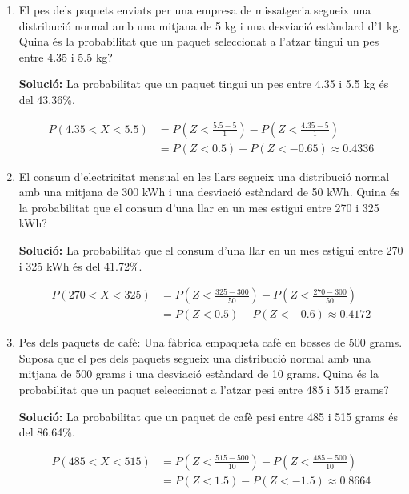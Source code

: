 \documentclass[12pt]{article}
\begin{document}
\begin{exemple} [title=]

\begin{enumerate} [start=19]

    \item El pes dels paquets enviats per una empresa de missatgeria segueix una distribució normal amb una mitjana de 5 kg i una desviació estàndard d'1 kg. Quina és la probabilitat que un paquet seleccionat a l'atzar tingui un pes entre 4.35 i 5.5 kg?
    
    \textbf{Solució:} La probabilitat que un paquet tingui un pes entre 4.35 i 5.5 kg és del 43.36\%.
    
    \begin{align*}
    P(4.35 < X < 5.5) &= P\left(Z< \frac{5.5 - 5}{1} \right) - P\left(Z< \frac{4.35 - 5}{1} \right) \\
    &= P(Z< 0.5) - P(Z< -0.65) \approx 0.4336  
    \end{align*}

    

    \item El consum d'electricitat mensual en les llars segueix una distribució normal amb una mitjana de 300 kWh i una desviació estàndard de 50 kWh. Quina és la probabilitat que el consum d'una llar en un mes estigui entre 270 i 325 kWh?
    
    \textbf{Solució:} La probabilitat que el consum d'una llar en un mes estigui entre 270 i 325 kWh és del 41.72\%.
    
    \begin{align*}
    P(270 < X < 325) &= P\left(Z< \frac{325 - 300}{50} \right) - P\left(Z< \frac{270 - 300}{50} \right) \\
    &= P(Z< 0.5) - P(Z< -0.6) \approx 0.4172
    \end{align*}


    \item Pes dels paquets de cafè: Una fàbrica empaqueta cafè en bosses de 500 grams. Suposa que el pes dels paquets segueix una distribució normal amb una mitjana de 500 grams i una desviació estàndard de 10 grams. Quina és la probabilitat que un paquet seleccionat a l'atzar pesi entre 485 i 515 grams?
    
    \textbf{Solució:} La probabilitat que un paquet de cafè pesi entre 485 i 515 grams és del 86.64\%.
    
    \begin{align*}
    P(485 < X < 515) &= P\left(Z< \frac{515 - 500}{10} \right) - P\left(Z< \frac{485 - 500}{10} \right) \\
    &= P(Z< 1.5) - P(Z< -1.5) \approx 0.8664
    \end{align*}



\end{enumerate}
\end{exemple}
\end{document}
